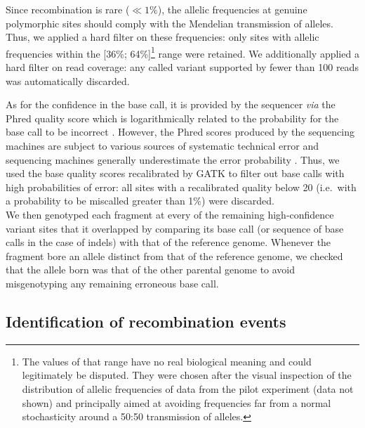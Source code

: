 Since recombination is rare ($\ll 1\%$), the allelic frequencies at genuine polymorphic sites should comply with the Mendelian transmission of alleles.
Thus, we applied a hard filter on these frequencies: only sites with allelic frequencies within the [36\%; 64\%]\footnote{The values of that range have no real biological meaning and could legitimately be disputed. They were chosen after the visual inspection of the distribution of allelic frequencies of data from the pilot experiment (data not shown) and principally aimed at avoiding frequencies far from a normal stochasticity around a 50:50 transmission of alleles.} range were retained.
We additionally applied a hard filter on read coverage: any called variant supported by fewer than 100 reads was automatically discarded.

As for the confidence in the base call, it is provided by the sequencer \textit{via} the Phred quality score which is logarithmically related to the probability for the base call to be incorrect \citep{ewing1998basecalling,ewing1998basecallinga}.
However, the Phred scores produced by the sequencing machines are subject to various sources of systematic technical error and sequencing machines generally underestimate the error probability \citep{gatk2012base}.
Thus, we used the base quality scores recalibrated by GATK to filter out base calls with high probabilities of error: all sites with a recalibrated quality below 20 (i.e.\ with a probability to be miscalled greater than 1\%) were discarded.\\


We then genotyped each fragment at every of the remaining high-confidence variant sites that it overlapped by comparing its base call (or sequence of base calls in the case of indels) with that of the reference genome.
Whenever the fragment bore an allele distinct from that of the reference genome, we checked that the allele born was that of the other parental genome to avoid misgenotyping any remaining erroneous base call.



\subsection{Identification of recombination events}


